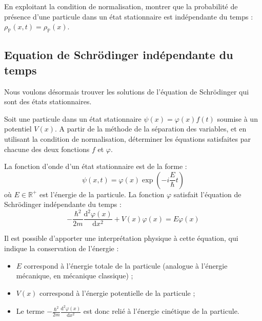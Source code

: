 \documentclass[11pt,fleqn]{book} %
\newcommand{\dd}{\mathrm{d}}
\begin{document}
\begin{capex}
	En exploitant la condition de normalisation, montrer que la probabilité de présence d'une particule dans un état stationnaire est indépendante du temps : $\rho_\mathbb{P}(x,t) = \rho_\mathbb{P}(x)$.
\end{capex}

\subsection{Equation de Schrödinger indépendante du temps}

Nous voulons désormais trouver les solutions de l'équation de Schrödinger qui sont des états stationnaires.

\begin{capex}
	Soit une particule dans un état stationnaire $\psi(x) = \varphi(x) f(t)$ soumise à un potentiel $V(x)$. A partir de la méthode de la séparation des variables, et en utilisant la condition de normalisation, déterminer les équations satisfaites par chacune des deux fonctions $f$ et $\varphi$.
\end{capex}

\begin{theorem}
	La fonction d'onde d'un état stationnaire est de la forme :
	\begin{equation}
		\psi(x,t) = \varphi(x) \exp\left(-i \frac{E}{\hbar} t\right)
	\end{equation}
	où $E \in \mathbb{R}^+$ est l'énergie de la particule.
	La fonction $\varphi$ satisfait l'équation de Schrödinger indépendante du temps :
	\begin{equation}
		- \frac{\hbar^2}{2m} \frac{\dd^2 \varphi(x)}{\dd x^2} + V(x) \varphi(x) = E \varphi(x)
	\end{equation}
\end{theorem}

\begin{proposition}
Il est possible d'apporter une interprétation physique à cette équation, qui indique la conservation de l'énergie :
\begin{itemize}
	\item $E$ correspond à l'énergie totale de la particule (analogue à l'énergie mécanique, en mécanique classique) ;
	\item $V(x)$ correspond à l'énergie potentielle de la particule ;
	\item Le terme $- \frac{\hbar^2}{2m} \frac{\dd^2 \varphi(x)}{\dd x^2}$ est donc relié à l'énergie cinétique de la particule.
\end{itemize}
\end{proposition}
\end{document}
